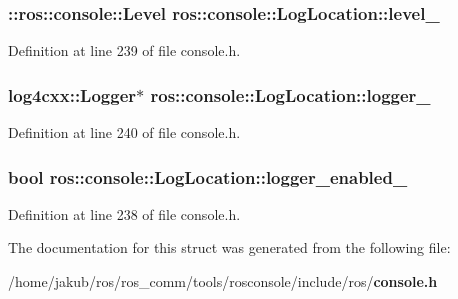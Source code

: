 \subsubsection[{level\_\-}]{\setlength{\rightskip}{0pt plus 5cm}::{\bf ros::console::Level} {\bf ros::console::LogLocation::level\_\-}}\label{structros_1_1console_1_1LogLocation_a40d395555a914b25c0f68ee151cd9315}


Definition at line 239 of file console.h.

\subsubsection[{logger\_\-}]{\setlength{\rightskip}{0pt plus 5cm}log4cxx::Logger$\ast$ {\bf ros::console::LogLocation::logger\_\-}}\label{structros_1_1console_1_1LogLocation_a9125638b4c553c1e0ffa1d25214c0115}


Definition at line 240 of file console.h.

\subsubsection[{logger\_\-enabled\_\-}]{\setlength{\rightskip}{0pt plus 5cm}bool {\bf ros::console::LogLocation::logger\_\-enabled\_\-}}\label{structros_1_1console_1_1LogLocation_ac5104796f7b78358f799fa62638d12aa}


Definition at line 238 of file console.h.



The documentation for this struct was generated from the following file:\begin{DoxyCompactItemize}
\item 
/home/jakub/ros/ros\_\-comm/tools/rosconsole/include/ros/{\bf console.h}\end{DoxyCompactItemize}

